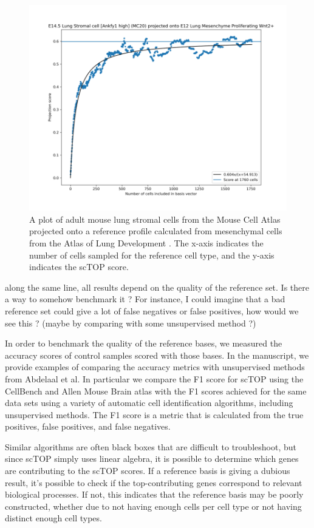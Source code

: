 \documentclass[12pt,american]{scrartcl}
\begin{document}
\begin{revresponse}
    \begin{figure}
	\centering
    \includegraphics[scale=0.4]{figs/sampling.png}
	\caption{A plot of adult mouse lung stromal cells from the Mouse Cell Atlas projected onto a reference profile calculated from mesenchymal cells from the Atlas of Lung Development \cite{negretti2021single}. The x-axis indicates the number of cells sampled for the reference cell type, and the y-axis indicates the scTOP score. }
	\label{sampling}
    \end{figure}
\end{revresponse}

\begin{revcomment}
along the same line, all results depend on the quality of the 
reference set. Is there a way to somehow benchmark it ? For instance, I 
could imagine that a bad reference set could give a lot of false 
negatives or false positives, how would we see this ? (maybe by 
comparing with some unsupervised method ?)
\end{revcomment}
\begin{revresponse}
    In order to benchmark the quality of the reference bases, we measured the accuracy scores of control samples scored with those bases. In the manuscript, we provide examples of comparing the accuracy metrics with unsupervised methods from Abdelaal et al. In particular we compare the F1 score for scTOP using the CellBench and Allen Mouse Brain atlas with the F1 scores achieved for the same data sets using a variety of automatic cell identification algorithms, including unsupervised methods. The F1 score is a metric that is calculated from the true positives, false positives, and false negatives. 

    Similar algorithms are often black boxes that are difficult to troubleshoot, but since scTOP simply uses linear algebra, it is possible to determine which genes are contributing to the scTOP scores. If a reference basis is giving a dubious result, it's possible to check if the top-contributing genes correspond to relevant biological processes. If not, this indicates that the reference basis may be poorly constructed, whether due to not having enough cells per cell type or not having distinct enough cell types.
\end{revresponse}
\end{document}
